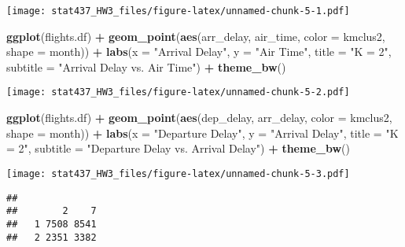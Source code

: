 \documentclass[
]{article}
\newenvironment{Shaded}{\begin{snugshade}}{\end{snugshade}}
\newcommand{\AttributeTok}[1]{\textcolor[rgb]{0.13,0.29,0.53}{#1}}
\newcommand{\FunctionTok}[1]{\textcolor[rgb]{0.13,0.29,0.53}{\textbf{#1}}}
\newcommand{\NormalTok}[1]{#1}
\newcommand{\SpecialCharTok}[1]{\textcolor[rgb]{0.81,0.36,0.00}{\textbf{#1}}}
\newcommand{\StringTok}[1]{\textcolor[rgb]{0.31,0.60,0.02}{#1}}
\begin{document}
\texttt{[image: stat437\_HW3\_files/figure-latex/unnamed-chunk-5-1.pdf]}

\begin{Shaded}
\begin{Highlighting}[]
\FunctionTok{ggplot}\NormalTok{(flights.df) }\SpecialCharTok{+} \FunctionTok{geom\_point}\NormalTok{(}\FunctionTok{aes}\NormalTok{(arr\_delay, air\_time, }\AttributeTok{color =}\NormalTok{ kmclus2,}
    \AttributeTok{shape =}\NormalTok{ month)) }\SpecialCharTok{+} \FunctionTok{labs}\NormalTok{(}\AttributeTok{x =} \StringTok{"Arrival Delay"}\NormalTok{, }\AttributeTok{y =} \StringTok{"Air Time"}\NormalTok{,}
    \AttributeTok{title =} \StringTok{"K = 2"}\NormalTok{, }\AttributeTok{subtitle =} \StringTok{"Arrival Delay vs. Air Time"}\NormalTok{) }\SpecialCharTok{+}
    \FunctionTok{theme\_bw}\NormalTok{()}
\end{Highlighting}
\end{Shaded}

\texttt{[image: stat437\_HW3\_files/figure-latex/unnamed-chunk-5-2.pdf]}

\begin{Shaded}
\begin{Highlighting}[]
\FunctionTok{ggplot}\NormalTok{(flights.df) }\SpecialCharTok{+} \FunctionTok{geom\_point}\NormalTok{(}\FunctionTok{aes}\NormalTok{(dep\_delay, arr\_delay, }\AttributeTok{color =}\NormalTok{ kmclus2,}
    \AttributeTok{shape =}\NormalTok{ month)) }\SpecialCharTok{+} \FunctionTok{labs}\NormalTok{(}\AttributeTok{x =} \StringTok{"Departure Delay"}\NormalTok{, }\AttributeTok{y =} \StringTok{"Arrival Delay"}\NormalTok{,}
    \AttributeTok{title =} \StringTok{"K = 2"}\NormalTok{, }\AttributeTok{subtitle =} \StringTok{"Departure Delay vs. Arrival Delay"}\NormalTok{) }\SpecialCharTok{+}
    \FunctionTok{theme\_bw}\NormalTok{()}
\end{Highlighting}
\end{Shaded}

\texttt{[image: stat437\_HW3\_files/figure-latex/unnamed-chunk-5-3.pdf]}

\begin{Shaded}
\end{Shaded}

\begin{verbatim}
##    
##        2    7
##   1 7508 8541
##   2 2351 3382
\end{verbatim}
\end{document}
